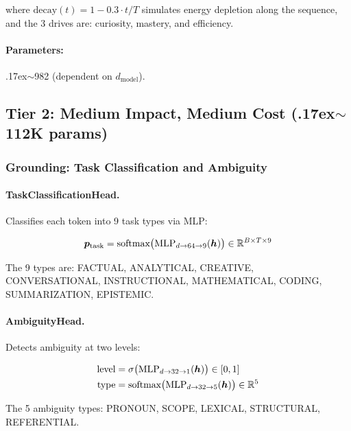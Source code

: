where $\text{decay}(t) = 1 - 0.3 \cdot t / T$ simulates energy depletion
along the sequence, and the 3 drives are: curiosity, mastery, and
efficiency.

\paragraph{Parameters:} {\raise.17ex\hbox{$\scriptstyle\sim$}}982 (dependent on $d_{\text{model}}$).

\subsection{Tier 2: Medium Impact, Medium Cost ({\raise.17ex\hbox{$\scriptstyle\sim$}}112K params)}

\subsubsection{Grounding: Task Classification and Ambiguity}
\label{sec:grounding}

\paragraph{TaskClassificationHead.}
Classifies each token into 9 task types via MLP:

\begin{equation}
    \bm{p}_{\text{task}} = \text{softmax}\big(\text{MLP}_{d \to 64 \to 9}(\bm{h})\big) \in \mathbb{R}^{B \times T \times 9}
\end{equation}

The 9 types are: FACTUAL, ANALYTICAL, CREATIVE, CONVERSATIONAL,
INSTRUCTIONAL, MATHEMATICAL, CODING, SUMMARIZATION, EPISTEMIC.

\paragraph{AmbiguityHead.}
Detects ambiguity at two levels:

\begin{align}
    \text{level} &= \sigma\big(\text{MLP}_{d \to 32 \to 1}(\bm{h})\big) \in [0, 1] \\
    \text{type} &= \text{softmax}\big(\text{MLP}_{d \to 32 \to 5}(\bm{h})\big) \in \mathbb{R}^5
\end{align}

The 5 ambiguity types: PRONOUN, SCOPE, LEXICAL, STRUCTURAL, REFERENTIAL.

